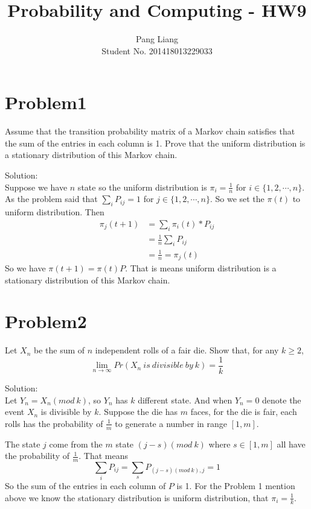 \documentclass[12pt]{article}
\title{Probability and Computing - HW9}
\author{Pang Liang\\ Student No. 201418013229033}
\begin{document}
\maketitle

\section{Problem1}
Assume that the transition probability matrix of a Markov chain satisfies that the sum of the entries in each column is 1. Prove that the uniform distribution is a stationary distribution of this Markov chain.

Solution:\\
Suppose we have $n$ state so the uniform distribution is $\pi_i = \frac{1}{n}$ for $i \in \{1, 2, \cdots, n \}$. As the problem said that $\sum_i P_{ij} = 1$ for $j \in \{1, 2, \cdots, n\}$. So we set the $\pi(t)$ to uniform distribution. Then
\begin{equation}
    \begin{split}
    \pi_j(t+1) &= \sum_i \pi_i(t) * P_{ij} \\
    &= \frac{1}{n} \sum_i P_{ij} \\
    & = \frac{1}{n} = \pi_j(t)
    \end{split}
\end{equation}
So we have $\pi(t+1) = \pi(t)P$. That is means uniform distribution is a stationary distribution of this Markov chain.

\section{Problem2}
Let $X_n$ be the sum of $n$ independent rolls of a fair die. Show that, for any $k \ge 2$,
\begin{equation}
    \lim_{n \to \infty} Pr(X_n\ is\ divisible\ by\ k) = \frac{1}{k}
\end{equation}

Solution:\\
Let $Y_n = X_n(mod\ k)$, so $Y_n$ has $k$ different state. And when $Y_n=0$ denote the event $X_n$ is divisible by $k$. Suppose the die has $m$ faces, for the die is fair, each rolls has the probability of $\frac{1}{m}$ to generate a number in range $[1, m]$.

The state $j$ come from the $m$ state $(j-s)(mod\ k)$ where $s \in [1,m]$ all have the probability of $\frac{1}{m}$. That means
\begin{equation}
    \sum_i P_{ij} = \sum_s P_{(j-s)(mod\ k),j} = 1
\end{equation}
So the sum of the entries in each column of $P$ is 1. For the Problem 1 mention above we know the stationary distribution is uniform distribution, that $\pi_i = \frac{1}{k}$.
\end{document}
